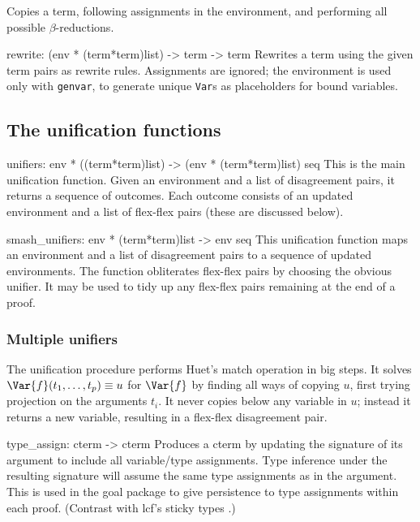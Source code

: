 Copies a term, 
following assignments in the environment,
and performing all possible \(\beta\)-reductions.

\beginprog
rewrite: (env * (term*term)list) -> term -> term
\endprog
Rewrites a term using the given term pairs as rewrite rules.  Assignments
are ignored; the environment is used only with {\tt genvar}, to generate
unique {\tt Var}s as placeholders for bound variables.


\subsection{The unification functions}


\beginprog
unifiers: env * ((term*term)list) -> (env * (term*term)list) seq
\endprog
This is the main unification function.
Given an environment and a list of disagreement pairs,
it returns a sequence of outcomes.
Each outcome consists of an updated environment and 
a list of flex-flex pairs (these are discussed below).

\beginprog
smash_unifiers: env * (term*term)list -> env seq
\endprog
This unification function maps an environment and a list of disagreement
pairs to a sequence of updated environments.  The function obliterates
flex-flex pairs by choosing the obvious unifier.  It may be used to tidy up
any flex-flex pairs remaining at the end of a proof.


\subsubsection{Multiple unifiers}
The unification procedure performs Huet's {\sc match} operation
\cite{huet75} in big steps.
It solves \(\Var{f}(t_1,\ldots,t_p) \equiv u\) for \(\Var{f}\) by finding
all ways of copying \(u\), first trying projection on the arguments
\(t_i\).  It never copies below any variable in \(u\); instead it returns a
new variable, resulting in a flex-flex disagreement pair.  


\beginprog
type_assign: cterm -> cterm
\endprog
Produces a cterm by updating the signature of its argument
to include all variable/type assignments.
Type inference under the resulting signature will assume the
same type assignments as in the argument.
This is used in the goal package to give persistence to type assignments
within each proof. 
(Contrast with {\sc lcf}'s sticky types \cite[page 148]{paulson-book}.)


